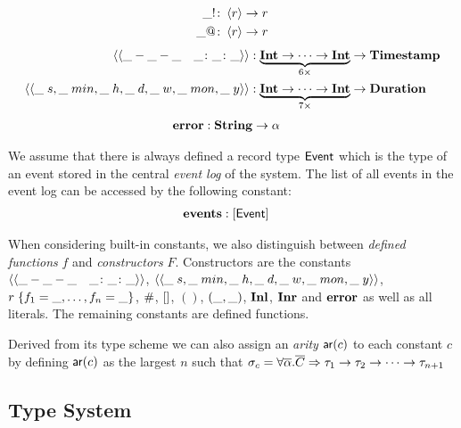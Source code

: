 %
\begin{align*}
  \_!&\colon \left\langle r\right\rangle \to r\\
  \_@&\colon \left\langle r\right\rangle \to r
\end{align*}
%
\begin{align*}
  \vdate{\mhole-\mhole-\mhole\quad\mhole\colon\mhole\colon\mhole}
  &: \underbrace{\tint \to \dots \to \tint}_{6\times} \to \ttimestamp%
  \\%
  \vdur{\mhole\; s, \mhole\; min, \mhole\;
    h,  \mhole\; d,  \mhole\;
    w,  \mhole\; mon, \mhole\; y}
  &: \underbrace{\tint \to \dots \to \tint}_{7\times} \to \tduration%
\end{align*}
%
\begin{align*}
  \mathbf{error} &: \mathbf{String} \to \alpha
\end{align*}

We assume that there is always defined a record type $\mathsf{Event}$
which is the type of an event stored in the central \emph{event log}
of the system. The list of all events in the event log can be accessed
by the following constant:
\begin{align*}
  \mathbf{events} &: \left[\mathsf{Event}\right]
\end{align*}

When considering built-in constants, we also distinguish between
\emph{defined functions} $f$ and \emph{constructors}
$F$. Constructors are the constants $\langle\langle\_-\_-\_\quad\_\colon\_\colon\_\rangle\rangle$,
$\langle\langle\_\; s, \_\; min, \_\; h, \_\; d, \_\; w,
  \_\; mon, \_ \; y\rangle\rangle$, $r\;\{f_1 = \_, \ldots ,
f_n = \_\}$, $\mathop{\#}$, $\left[\right]$, $()$, $(\_,\_)$,
$\mathbf{Inl}$, $\mathbf{Inr}$ and $\mathbf{error}$ as well as all
literals. The remaining constants are defined functions.

Derived from its type scheme we can also assign an \emph{arity}
$\mathsf{ar}(c)$ to each constant $c$ by defining $\mathsf{ar}(c)$ as the
largest $n$ such that $\sigma_c = \forall \overline{\alpha}.\overline{C} \Rightarrow
\tau_1 \to \tau_2 \to \dots \to \tau_{n+1}$

\subsection{Type System}
\label{sec:constraint-system}

